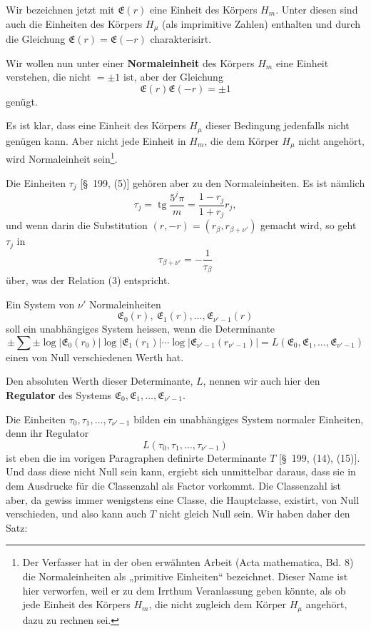 \documentclass[11pt]{article}
\newcommand{\tg}{\operatorname{tg}}
\begin{document}
Wir bezeichnen jetzt mit $\mathfrak E(r)$ eine Einheit des Körpers $H_m$. Unter diesen sind auch die Einheiten des Körpers $H_\mu$ (als
imprimitive Zahlen) enthalten und durch die Gleichung $\mathfrak E(r)=\mathfrak E(-r)$ charakterisirt.

Wir wollen nun unter einer \textbf{Normaleinheit} des Körpers $H_m$ eine Einheit verstehen, die nicht $=\pm1$ ist, aber der Gleichung
\begin{equation}
\mathfrak E(r)\mathfrak E(-r)=\pm1
\tag{3}
\end{equation}
genügt.

Es ist klar, dass eine Einheit des Körpers $H_\mu$ dieser Bedingung jedenfalls nicht genügen kann. Aber nicht jede Einheit in $H_m$, die dem Körper $H_\mu$ nicht angehört, wird Normaleinheit sein\footnote{Der Verfasser hat in der oben erwähnten Arbeit (Acta mathematica, Bd. 8) die Normaleinheiten als „primitive Einheiten“ bezeichnet. Dieser Name ist hier verworfen, weil er zu dem Irrthum Veranlassung geben könnte, als ob jede Einheit des Körpers $H_m$, die nicht zugleich dem Körper $H_\mu$ angehört, dazu zu rechnen sei.}.

Die Einheiten $\tau_j$ [\S~199, (5)] gehören aber zu den Normaleinheiten. Es ist nämlich
\begin{equation}
\tau_j=\tg\frac{5^j\pi}{m}=\frac{1-r_j}{1+r_j}r_j,
\tag{4}
\end{equation}
und wenn darin die Substitution $(r,-r)=(r_\beta,r_{\beta+\nu'})$ gemacht wird, so geht $\tau_j$ in
\begin{equation}
\tau_{\beta+\nu'}=-\frac1{\tau_\beta}
\tag{5}
\end{equation}
über, was der Relation (3) entspricht.

Ein System von $\nu'$ Normaleinheiten
\[
\mathfrak E_0(r),\ \mathfrak E_1(r),\ldots,\mathfrak E_{\nu'-1}(r)
\]
soll ein unabhängiges System heissen, wenn die Determinante
\begin{equation}
\pm\sum\pm\log|\mathfrak E_0(r_0)|\log|\mathfrak E_1(r_1)|\cdots\log|\mathfrak E_{\nu'-1}(r_{\nu'-1})|
=L(\mathfrak E_0,\mathfrak E_1,\ldots,\mathfrak E_{\nu'-1})
\tag{6}
\end{equation}
einen von Null verschiedenen Werth hat.

Den absoluten Werth dieser Determinante, $L$, nennen wir auch hier den \textbf{Regulator} des Systems $\mathfrak E_0,\mathfrak E_1,\ldots,\mathfrak E_{\nu'-1}$.

Die Einheiten $\tau_0,\tau_1,\ldots,\tau_{\nu'-1}$ bilden ein unabhängiges System normaler Einheiten, denn ihr Regulator
\[
L(\tau_0,\tau_1,\ldots,\tau_{\nu'-1})
\]
ist eben die im vorigen Paragraphen definirte Determinante $T$ [\S~199, (14), (15)]. Und dass diese nicht Null sein kann, ergiebt sich unmittelbar daraus, dass sie in dem Ausdrucke für die
Classenzahl als Factor vorkommt. Die Classenzahl ist aber, da gewiss immer wenigstens eine Classe, die Hauptclasse, existirt, von Null verschieden, und also kann auch $T$ nicht gleich Null sein. Wir haben daher den Satz:
\end{document}
